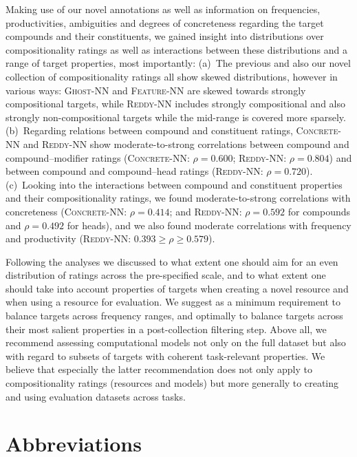 \documentclass[output=paper,colorlinks,citecolor=brown]{langscibook}
\begin{document}
Making use of our novel annotations as well as information on frequencies, productivities, ambiguities and degrees of concreteness regarding the target compounds and their constituents, we gained insight into distributions over compositionality ratings as well as interactions between these distributions and a range of target properties, most importantly: (a)~The previous and also our novel collection of compositionality ratings all show skewed distributions, however in various ways: \textsc{Ghost-NN} and \textsc{Feature-NN} are skewed towards strongly compositional targets, while \textsc{Reddy-NN} includes strongly compositional and also strongly non-compositional targets while the mid-range is covered more sparsely. (b)~Regarding relations between compound and constituent ratings, \textsc{Concrete-NN} and \textsc{Reddy-NN} show moderate-to-strong correlations between compound and compound--modifier ratings (\textsc{Concrete-NN}: $\rho=0.600$; \textsc{Reddy-NN}: $\rho=0.804$) and between compound and compound--head ratings (\textsc{Reddy-NN}: $\rho=0.720$). (c)~Looking into the interactions between compound and constituent properties and their compositionality ratings, we found moderate-to-strong correlations with concreteness (\textsc{Concrete-NN}: $\rho=0.414$; and \textsc{Reddy-NN}: $\rho=0.592$ for compounds and $\rho=0.492$ for heads), and we also found moderate correlations with frequency and productivity (\textsc{Reddy-NN}: $0.393 \ge \rho \ge 0.579$).

Following the analyses we discussed to what extent one should aim for an even distribution of ratings across the pre-specified scale, and to what extent one should take into account properties of targets when creating a novel resource and when using a resource for evaluation. We suggest as a minimum requirement to balance targets across frequency ranges, and optimally to balance targets across their most salient properties in a post-collection filtering step. Above all, we recommend assessing computational models not only on the full dataset but also with regard to subsets of targets with coherent task-relevant properties. We believe that especially the latter recommendation does not only apply to compositionality ratings (resources and models) but more generally to creating and using evaluation datasets across tasks.


\section*{Abbreviations}
\end{document}
